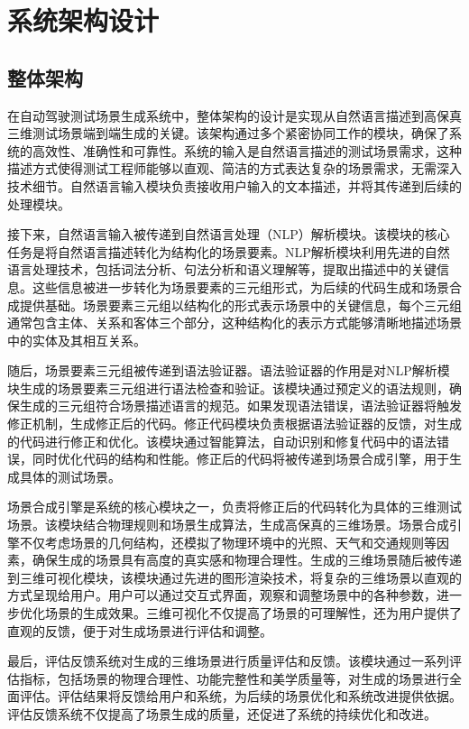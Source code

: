 \chapter{系统架构设计}
\section{整体架构}
在自动驾驶测试场景生成系统中，整体架构的设计是实现从自然语言描述到高保真三维测试场景端到端生成的关键。该架构通过多个紧密协同工作的模块，确保了系统的高效性、准确性和可靠性。系统的输入是自然语言描述的测试场景需求，这种描述方式使得测试工程师能够以直观、简洁的方式表达复杂的场景需求，无需深入技术细节。自然语言输入模块负责接收用户输入的文本描述，并将其传递到后续的处理模块。

接下来，自然语言输入被传递到自然语言处理（NLP）解析模块。该模块的核心任务是将自然语言描述转化为结构化的场景要素。NLP解析模块利用先进的自然语言处理技术，包括词法分析、句法分析和语义理解等，提取出描述中的关键信息。这些信息被进一步转化为场景要素的三元组形式，为后续的代码生成和场景合成提供基础。场景要素三元组以结构化的形式表示场景中的关键信息，每个三元组通常包含主体、关系和客体三个部分，这种结构化的表示方式能够清晰地描述场景中的实体及其相互关系。

随后，场景要素三元组被传递到语法验证器。语法验证器的作用是对NLP解析模块生成的场景要素三元组进行语法检查和验证。该模块通过预定义的语法规则，确保生成的三元组符合场景描述语言的规范。如果发现语法错误，语法验证器将触发修正机制，生成修正后的代码。修正代码模块负责根据语法验证器的反馈，对生成的代码进行修正和优化。该模块通过智能算法，自动识别和修复代码中的语法错误，同时优化代码的结构和性能。修正后的代码将被传递到场景合成引擎，用于生成具体的测试场景。

场景合成引擎是系统的核心模块之一，负责将修正后的代码转化为具体的三维测试场景。该模块结合物理规则和场景生成算法，生成高保真的三维场景。场景合成引擎不仅考虑场景的几何结构，还模拟了物理环境中的光照、天气和交通规则等因素，确保生成的场景具有高度的真实感和物理合理性。生成的三维场景随后被传递到三维可视化模块，该模块通过先进的图形渲染技术，将复杂的三维场景以直观的方式呈现给用户。用户可以通过交互式界面，观察和调整场景中的各种参数，进一步优化场景的生成效果。三维可视化不仅提高了场景的可理解性，还为用户提供了直观的反馈，便于对生成场景进行评估和调整。

最后，评估反馈系统对生成的三维场景进行质量评估和反馈。该模块通过一系列评估指标，包括场景的物理合理性、功能完整性和美学质量等，对生成的场景进行全面评估。评估结果将反馈给用户和系统，为后续的场景优化和系统改进提供依据。评估反馈系统不仅提高了场景生成的质量，还促进了系统的持续优化和改进。

